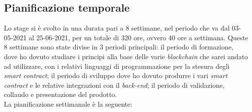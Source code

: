 \subsection{Pianificazione temporale}
Lo stage si è svolto in una durata pari a 8 settimane, nel periodo che va dal 03-05-2021 al 25-06-2021, per un totale di 320 ore, ovvero 40 ore a settimana. Queste 8 settimane sono state divise in 3 periodi principali: il periodo di formazione, dove ho dovuto studiare i principi alla base delle varie \emph{blockchain} che sarei andato ad utilizzare, con i relativi linguaggi di programmazione per la stesura degli \emph{smart contract}; il periodo di sviluppo dove ho dovuto produrre i vari \emph{smart contract} e le relative integrazioni con il \emph{back-end}; il periodo di validazione, collaudo e presentazione del prodotto. \\

La pianificazione settimanale è la seguente: 

